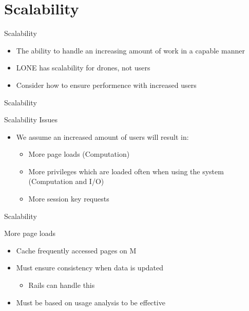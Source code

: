 \author{Esben Pilgaard M\o{}ller}

\section{Scalability}
\begin{frame}{Scalability}{}
  \begin{itemize}
  	\item The ability to handle an increasing amount of work in a capable manner
  	\item LONE has scalability for drones, not users
  	\item Consider how to ensure performence with increased users
  \end{itemize}
\end{frame}

\begin{frame}{Scalability}{}
\begin{block}{Scalability Issues}
  \begin{itemize}
    \item We assume an increased amount of users will result in:
    \begin{itemize}
			\item More page loads (Computation)
			\item More privileges which are loaded often when using the system (Computation and I/O)
			\item More session key requests
		\end{itemize}
  \end{itemize}
\end{block}
\end{frame}

\begin{frame}{Scalability}{}
\begin{block}{More page loads}
  \begin{itemize}
    \item Cache frequently accessed pages on M
    \item Must ensure consistency when data is updated
    	\begin{itemize}
				\item Rails can handle this
			\end{itemize}
		\item Must be based on usage analysis to be effective
  \end{itemize}
\end{block}
\end{frame}

